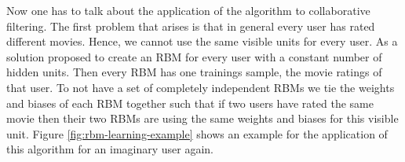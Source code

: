 \documentclass[crop=false,10pt]{standalone}
\begin{document}
      Now one has to talk about the application of the algorithm to collaborative filtering.
      The first problem that arises is that in general every user has rated different movies.
      Hence, we cannot use the same visible units for every user.
      As a solution \cite{Hinton2007} proposed to create an RBM for every user with a constant number of hidden units.
      Then every RBM has one trainings sample, the movie ratings of that user.
      To not have a set of completely independent RBMs we tie the weights and biases of each RBM together such that if two users have rated the same movie then their two RBMs are using the same weights and biases for this visible unit.
      Figure \ref{fig:rbm-learning-example} shows an example for the application of this algorithm for an imaginary user again.
\end{document}
